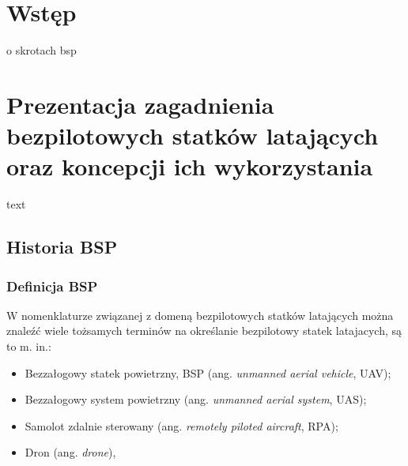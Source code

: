 

\newcommand{\kierunek}{INFORMATYKA}
\newcommand{\stopien}{STUDIA II$^{\mathrm{o}}$} %
\newcommand{\temat}{MOBILNY SYSTEM ZARZĄDZANIA I STEROWANIA BEZPILOTOWYM STATKIEM LATAJĄCYM}
\newcommand{\data}{Warszawa 2022}
\newcommand{\autor}{Norbert WASZKOWIAK}
\newcommand{\promotor}{dr inż. Michał DYK}
\newcommand{\zgoda}{TAK} %
\newcommand{\specjalnosc}{SYSTEMY INFORMATYCZNE}
\newcommand{\bibTitle}[1]{``#1''}





\inserttitlepage

\section*{Wstęp} 
    
     o skrotach bsp
\clearpage

\section{Prezentacja zagadnienia bezpilotowych statków latających oraz koncepcji ich wykorzystania}
\hspace{1cm}text
\subsection{Historia BSP}
\subsubsection{Definicja BSP}
\hspace{1cm}W nomenklaturze związanej z domeną bezpilotowych statków latających można znaleźć wiele tożsamych terminów na określanie bezpilotowy statek latajacych, są to m. in.:
\begin{itemize}
  \item Bezzałogowy statek powietrzny, BSP (ang. \textit{unmanned aerial vehicle}, UAV);
  \item Bezzałogowy system powietrzny (ang. \textit{unmanned aerial system}, UAS);
  \item Samolot zdalnie sterowany (ang. \textit{remotely piloted aircraft}, RPA);
  \item Dron (ang. \textit{drone}),
\end{itemize}


